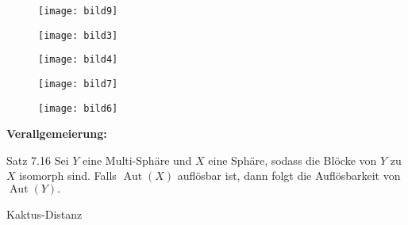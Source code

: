 \documentclass{beamer}
\DeclareMathOperator{\Aut}{Aut}
\begin{document}
\begin{frame}
\begin{figure}[H]
\begin{center}
\texttt{[image: bild9]}
\end{center}
\end{figure}
\end{frame}
\begin{frame}
\begin{figure}[H]
\begin{center}
\texttt{[image: bild3]}
\end{center}
\end{figure}
\end{frame}
\begin{frame}
\begin{figure}[H]
\begin{center}
\texttt{[image: bild4]}
\end{center}
\end{figure}
\end{frame}
\begin{frame}
\begin{figure}[H]
\begin{center}
\texttt{[image: bild7]}
\end{center}
\end{figure}
\end{frame}
\begin{frame}
\begin{figure}[H]
\begin{center}
\texttt{[image: bild6]}
\end{center}
\end{figure}
\end{frame}
\begin{frame}
\textbf{Verallgemeierung:}
\begin{block}{Satz 7.16}
Sei $Y$ eine Multi-Sphäre und $X$ eine Sphäre, sodass die Blöcke von $Y$ zu $X$ isomorph sind. Falls $\Aut(X)$ auflösbar ist, dann folgt die Auflösbarkeit von $\Aut(Y).$ 
\end{block}
\end{frame}
\begin{frame}
\begin{center}
\huge{Kaktus-Distanz}
\end{center}
\end{frame}
\end{document}
